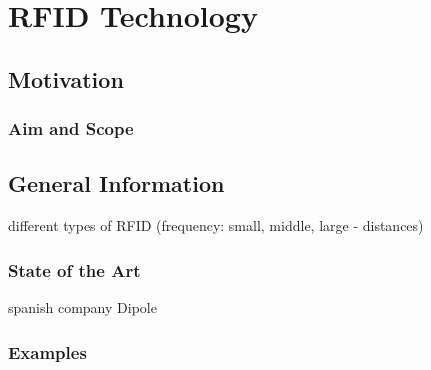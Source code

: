 
\chapter{RFID Technology}

\section{Motivation}
\subsection{Aim and Scope}
\section{General Information}
different types of RFID (frequency: small, middle, large - distances)
\subsection{State of the Art}

\cite{considering_rfid}

\cite{dipole}
spanish company Dipole 

\subsection{Examples}







